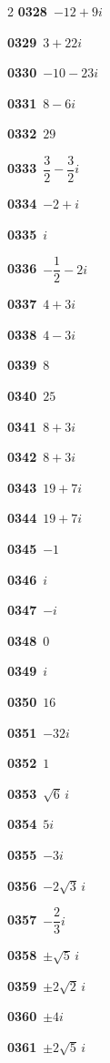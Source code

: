 \documentclass[10pt,a4paper]{article}
\begin{document}
\begin{multicols}{2}
\noindent\textbf{0328}\ $-12+9i$\par
\noindent\textbf{0329}\ $3+22i$\par
\noindent\textbf{0330}\ $-10-23i$\par
\noindent\textbf{0331}\ $8-6i$\par
\noindent\textbf{0332}\ $29$\par
\noindent\textbf{0333}\ $\dfrac{3}{2}-\dfrac{3}{2}i$\par
\noindent\textbf{0334}\ $-2+i$\par
\noindent\textbf{0335}\ $i$\par
\noindent\textbf{0336}\ $-\dfrac{1}{2}-2i$\par
\noindent\textbf{0337}\ $4+3i$\par
\noindent\textbf{0338}\ $4-3i$\par
\noindent\textbf{0339}\ $8$\par
\noindent\textbf{0340}\ $25$\par
\noindent\textbf{0341}\ $8+3i$\par
\noindent\textbf{0342}\ $8+3i$\par
\noindent\textbf{0343}\ $19+7i$\par
\noindent\textbf{0344}\ $19+7i$\par
\noindent\textbf{0345}\ $-1$\par
\noindent\textbf{0346}\ $i$\par
\noindent\textbf{0347}\ $-i$\par
\noindent\textbf{0348}\ $0$\par
\noindent\textbf{0349}\ $i$\par
\noindent\textbf{0350}\ $16$\par
\noindent\textbf{0351}\ $-32i$\par
\noindent\textbf{0352}\ $1$\par
\noindent\textbf{0353}\ $\sqrt{6}\,i$\par
\noindent\textbf{0354}\ $5i$\par
\noindent\textbf{0355}\ $-3i$\par
\noindent\textbf{0356}\ $-2\sqrt{3}\,i$\par
\noindent\textbf{0357}\ $-\dfrac{2}{3}i$\par
\noindent\textbf{0358}\ $\pm\sqrt{5}\,i$\par
\noindent\textbf{0359}\ $\pm 2\sqrt{2}\,i$\par
\noindent\textbf{0360}\ $\pm 4i$\par
\noindent\textbf{0361}\ $\pm 2\sqrt{5}\,i$\par

\end{multicols}
\end{document}
